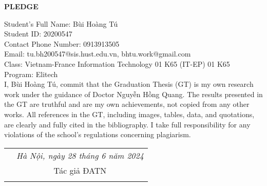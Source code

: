 \documentclass[../main.tex]{subfiles}
\begin{document}
\hfill
\begin{center}
    \LARGE\textbf{PLEDGE}\\
\end{center}
\vspace{1cm}
Student's Full Name: Bùi Hoàng Tú\\
Student ID: 20200547\\
Contact Phone Number: 0913913505\\ 
Email: tu.bh200547@sis.hust.edu.vn, bhtu.work@gmail.com\\
Class: Vietnam-France Information Technology 01 K65 (IT-EP) 01 K65\\
Program: Elitech\\

\vspace{1cm}
I, Bùi Hoàng Tú, commit that the Graduation Thesis (GT) is my own research work under the guidance of Doctor Nguyễn Hồng Quang. The results presented in the GT are truthful and are my own achievements, not copied from any other works. All references in the GT, including images, tables, data, and quotations, are clearly and fully cited in the bibliography. I take full responsibility for any violations of the school's regulations concerning plagiarism.

\begin{table}[H]
\centering
\begin{tabular}{p{5cm} c}
\multicolumn{1}{c}{\textbf{}} &\emph{Hà Nội, ngày 28 tháng 6 năm 2024   }\vspace{0.4cm}\\
\textbf{}               & Tác giả ĐATN \vspace{3cm} \\

\textbf{}               & \emph{}
\end{tabular}
\end{table}
\end{document}

